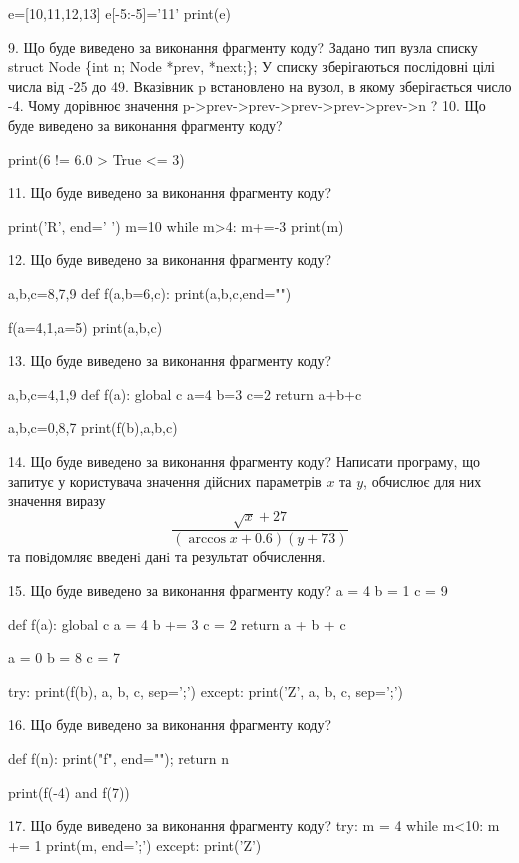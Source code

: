\documentclass[11pt]{article}
\begin{document}
e=[10,11,12,13]
e[-5:-5]='11'
print(e)


9. Що буде виведено за виконання фрагменту коду?
Задано тип вузла списку
struct Node \{int n; Node *prev, *next;\};
У списку зберігаються послідовні цілі числа від -25 до 49. Вказівник p встановлено на вузол, в якому зберігається число -4.
Чому дорівнює значення p->prev->prev->prev->prev->prev->n ?
10. Що буде виведено за виконання фрагменту коду?

print(6 != 6.0 > True <= 3)

11. Що буде виведено за виконання фрагменту коду?

print('R', end=' ')
m=10
while m>4:
    m+=-3
print(m)


12. Що буде виведено за виконання фрагменту коду?

a,b,c=8,7,9
def f(a,b=6,c):
    print(a,b,c,end="")

f(a=4,1,a=5)
print(a,b,c)


13. Що буде виведено за виконання фрагменту коду?

a,b,c=4,1,9
def f(a):
global c    a=4
    b=3
    c=2
    return a+b+c

a,b,c=0,8,7
print(f(b),a,b,c)

14. Що буде виведено за виконання фрагменту коду?
Написати програму, що запитує у користувача значення дійсних параметрів $x$ та $y$, обчислює для них значення виразу 
$$\frac{\sqrt x + 27}{(\arccos x + 0.6) (y + 73)}$$ 
та повiдомляє введенi данi та результат обчислення.


15. Що буде виведено за виконання фрагменту коду?
a = 4
b = 1
c = 9

def f(a):
global c    a = 4
    b += 3
    c = 2
    return a + b + c

a = 0
b = 8
c = 7

try:
    print(f(b), a, b, c, sep=';')
except:
    print('Z', a, b, c, sep=';')

16. Що буде виведено за виконання фрагменту коду?

def f(n):
    print("f", end="");
    return n

print(f(-4) and f(7))

17. Що буде виведено за виконання фрагменту коду?
try:
    m = 4
    while m<10:
        m += 1
    print(m, end=';')
except:
    print('Z')
\end{document}
